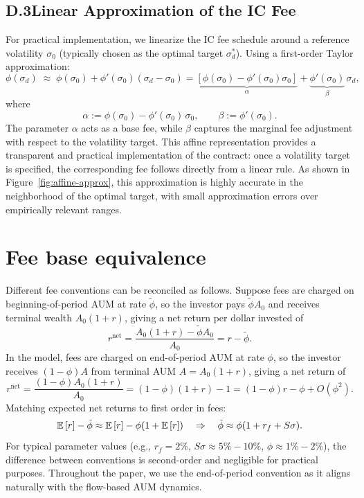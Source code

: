 \subsection*{D.3\quad Linear Approximation of the IC Fee}
For practical implementation, we linearize the IC fee schedule around a reference volatility $\sigma_0$ (typically chosen as the optimal target $\sigma_d^*$). Using a first-order Taylor approximation:
\begin{equation}
\phi(\sigma_d) \;\approx\; \phi(\sigma_0) + \phi'(\sigma_0)(\sigma_d - \sigma_0) = \underbrace{[\phi(\sigma_0) - \phi'(\sigma_0)\sigma_0]}_{\alpha} + \underbrace{\phi'(\sigma_0)}_{\beta}\,\sigma_d,
\end{equation}
where
\begin{equation}
\alpha := \phi(\sigma_0) - \phi'(\sigma_0)\,\sigma_0, \qquad \beta := \phi'(\sigma_0).
\end{equation}
The parameter $\alpha$ acts as a base fee, while $\beta$ captures the marginal fee adjustment with respect to the volatility target. This affine representation provides a transparent and practical implementation of the contract: once a volatility target is specified, the corresponding fee follows directly from a linear rule. As shown in Figure~\ref{fig:affine-approx}, this approximation is highly accurate in the neighborhood of the optimal target, with small approximation errors over empirically relevant ranges.

\section{Fee base equivalence}
\label{app:fee-base}
Different fee conventions can be reconciled as follows. Suppose fees are charged on beginning-of-period AUM at rate $\tilde\phi$, so the investor pays $\tilde\phi A_0$ and receives terminal wealth $A_0(1+r)$, giving a net return per dollar invested of
\[
r^{\text{net}} = \frac{A_0(1+r) - \tilde\phi A_0}{A_0} = r - \tilde\phi.
\]
In the model, fees are charged on end-of-period AUM at rate $\phi$, so the investor receives $(1-\phi)A$ from terminal AUM $A=A_0(1+r)$, giving a net return of
\[
r^{\text{net}} = \frac{(1-\phi)A_0(1+r)}{A_0} = (1-\phi)(1+r) - 1 = (1-\phi)r - \phi + O(\phi^2).
\]
Matching expected net returns to first order in fees:
\[
{\mathbb{E}}\,[r] - \tilde\phi \approx {\mathbb{E}}\,[r] - \phi(1+{\mathbb{E}}\,[r]) \quad\Rightarrow\quad \tilde\phi \approx \phi(1+r_f + S\sigma).
\]
For typical parameter values (e.g., $r_f=2\%$, $S\sigma \approx 5\%-10\%$, $\phi \approx 1\%-2\%$), the difference between conventions is second-order and negligible for practical purposes. Throughout the paper, we use the end-of-period convention as it aligns naturally with the flow-based AUM dynamics.

